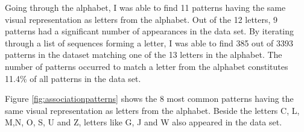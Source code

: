     Going through the alphabet, I was able to find 11 patterns having the same visual representation as letters from the alphabet. Out of the 12 letters, 9 patterns had a significant number of appearances in the data set. By iterating through a list of sequences forming a letter, I was able to find 385 out of 3393 patterns in the dataset matching one of the 13 letters in the alphabet. The number of patterns occurred to match a letter from the alphabet constitutes 11.4\% of all patterns in the data set. 

    Figure \ref{fig:associationpatterns} shows the 8 most common patterns having the same visual representation as letters from the alphabet. Beside the letters C, L, M,N, O, S, U and Z, letters like G, J and W also appeared in the data set.

    \clearpage

